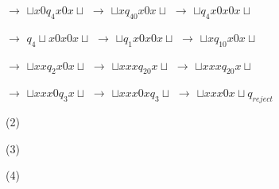 \documentclass{article}
\begin{document}
$\to$ ${\sqcup}x0q_4x0x{\sqcup}$ $\to$ ${\sqcup}xq_40x0x{\sqcup}$ $\to$ ${\sqcup}q_4x0x0x{\sqcup}$
 
$\to$ $q_4{\sqcup}x0x0x{\sqcup}$ $\to$ ${\sqcup}q_1x0x0x{\sqcup}$ $\to$ ${\sqcup}xq_10x0x{\sqcup}$ 

$\to$ ${\sqcup}xxq_2x0x{\sqcup}$ $\to$ ${\sqcup}xxxq_20x{\sqcup}$ $\to$ ${\sqcup}xxxq_20x{\sqcup}$ 

$\to$ ${\sqcup}xxx0q_3x{\sqcup}$ $\to$ ${\sqcup}xxx0xq_3{\sqcup}$ $\to$ ${\sqcup}xxx0x{\sqcup}q_{reject}$

\vspace{5mm}

\hspace{0.5cm}(2)

\vspace{5mm}

\hspace{0.5cm}(3)

\vspace{5mm}

\hspace{0.5cm}(4)

\vspace{5mm}
\end{document}
